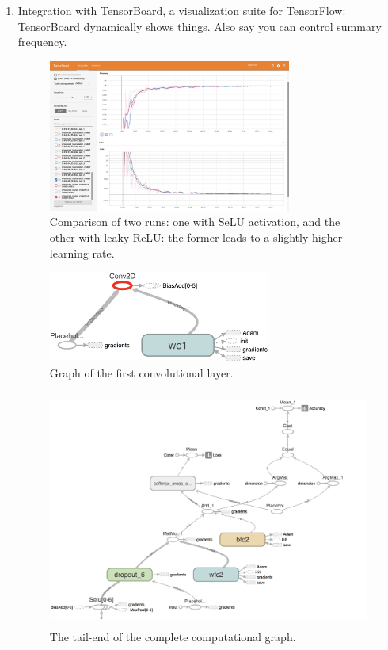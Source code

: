 \documentclass[a4paper, 11pt]{article} %
\begin{document}
		\begin{enumerate}
			\item Integration with TensorBoard, a visualization suite for 
			TensorFlow: TensorBoard dynamically shows things. Also say you can 
			control summary frequency.
			\begin{figure}[H]
				\centering
				\includegraphics[height=5cm]{figures/tb_acc_loss}
				\caption{Comparison of two runs: one with SeLU activation, and 
				the other with leaky ReLU: the former leads to a slightly 
				higher 
				learning rate.}
			\end{figure}
			\begin{figure}[H]
				\centering
				\includegraphics[height=3cm]{figures/tb_graph_1}
				\caption{Graph of the first convolutional layer.}
			\end{figure}
			\begin{figure}[H]
				\centering
				\includegraphics[height=7.8cm]{figures/tb_graph_2}
				\caption{The tail-end of the complete computational graph.}

\end{figure}
\end{enumerate}
\end{document}
